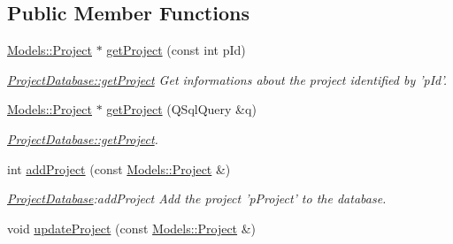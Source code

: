 \subsection*{Public Member Functions}
\begin{DoxyCompactItemize}
\item 
\hyperlink{classModels_1_1Project}{Models\-::\-Project} $\ast$ \hyperlink{classDatabases_1_1ProjectDatabase_a1bf482f645ba7bea80ed6c52bc013a4d}{get\-Project} (const int p\-Id)
\begin{DoxyCompactList}\small\item\em \hyperlink{classDatabases_1_1ProjectDatabase_a1bf482f645ba7bea80ed6c52bc013a4d}{Project\-Database\-::get\-Project} Get informations about the project identified by 'p\-Id'. \end{DoxyCompactList}\item 
\hyperlink{classModels_1_1Project}{Models\-::\-Project} $\ast$ \hyperlink{classDatabases_1_1ProjectDatabase_a165ec8686b565792e01fb79c550e6d4d}{get\-Project} (Q\-Sql\-Query \&q)
\begin{DoxyCompactList}\small\item\em \hyperlink{classDatabases_1_1ProjectDatabase_a1bf482f645ba7bea80ed6c52bc013a4d}{Project\-Database\-::get\-Project}. \end{DoxyCompactList}\item 
int \hyperlink{classDatabases_1_1ProjectDatabase_a270a365c4a9345029447c7a958444dac}{add\-Project} (const \hyperlink{classModels_1_1Project}{Models\-::\-Project} \&)
\begin{DoxyCompactList}\small\item\em \hyperlink{classDatabases_1_1ProjectDatabase}{Project\-Database}\-:add\-Project Add the project 'p\-Project' to the database. \end{DoxyCompactList}\item 
\hypertarget{classDatabases_1_1ProjectDatabase_a0816c768932243906e37045d4640cc8a}{void \hyperlink{classDatabases_1_1ProjectDatabase_a0816c768932243906e37045d4640cc8a}{update\-Project} (const \hyperlink{classModels_1_1Project}{Models\-::\-Project} \&)}\label{classDatabases_1_1ProjectDatabase_a0816c768932243906e37045d4640cc8a}


\end{DoxyCompactItemize}
